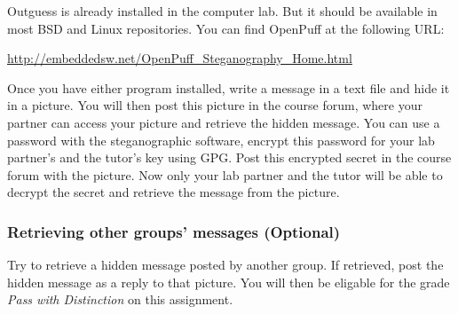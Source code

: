 \documentclass[a4paper,nocourse]{miunasgn}
\begin{document}
Outguess is already installed in the computer lab.
But it should be available in most BSD and Linux repositories.
You can find OpenPuff at the following URL:
\begin{center}
  \url{http://embeddedsw.net/OpenPuff_Steganography_Home.html}
\end{center}

Once you have either program installed, write a message in a text file and hide 
it in a picture.
You will then post this picture in the course forum, where your partner can
access your picture and retrieve the hidden message.
You can use a password with the steganographic software, encrypt this password 
for your lab partner's and the tutor's key using GPG.
Post this encrypted secret in the course forum with the picture.
Now only your lab partner and the tutor will be able to decrypt the secret and 
retrieve the message from the picture.

\subsubsection{Retrieving other groups' messages (Optional)}
\label{subsec:Stegopt}
Try to retrieve a hidden message posted by another group.
If retrieved, post the hidden message as a reply to that picture.
You will then be eligable for the grade \emph{Pass with Distinction} on this 
assignment.

% 
%
%
\end{document}
